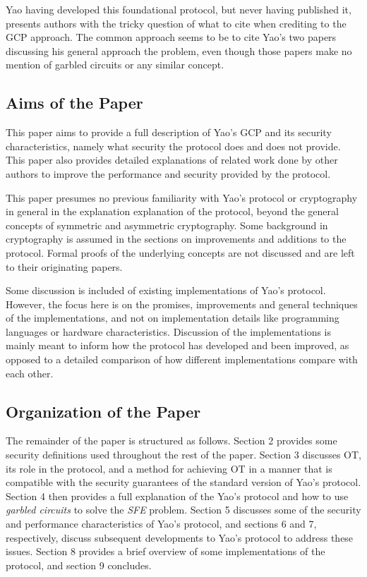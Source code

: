 Yao having developed this foundational protocol, but never having published it, presents authors with the tricky question of what to cite when crediting to the \ac{GCP} approach.  The common approach seems to be to cite Yao's two papers discussing his general approach the problem, even though those papers make no mention of garbled circuits or any similar concept.

\subsection{Aims of the Paper}

This paper aims to provide a full description of Yao's \ac{GCP} and its security characteristics, namely what security the protocol does and does not provide.  This paper also provides detailed explanations of related work done by other authors to improve the performance and security provided by the protocol.

This paper presumes no previous familiarity with Yao's protocol or cryptography in general in the explanation explanation of the protocol, beyond the general concepts of symmetric and asymmetric cryptography.  Some background in cryptography is assumed in the sections on improvements and additions to the protocol.  Formal proofs of the underlying concepts are not discussed and are left to their originating papers.

Some discussion is included of existing implementations of Yao's protocol. However, the focus here is on the promises, improvements and general techniques of the implementations, and not on implementation details like programming languages or hardware characteristics. Discussion of the implementations is mainly meant to inform how the protocol has developed and been improved, as opposed to a detailed comparison of how different implementations compare with each other.

\subsection{Organization of the Paper}

The remainder of the paper is structured as follows. Section 2 provides some security definitions used throughout the rest of the paper. Section 3 discusses \ac{OT}, its role in the protocol, and a method for achieving \ac{OT} in a manner that is compatible with the security guarantees of the standard version of Yao's protocol.  Section 4 then provides a full explanation of the Yao's protocol and how to use \emph{garbled circuits} to solve the \emph{SFE} problem. Section 5 discusses some of the security and performance characteristics of Yao's protocol, and sections 6 and 7, respectively, discuss subsequent developments to Yao's protocol to address these issues. Section 8 provides a brief overview of some implementations of the protocol, and section 9 concludes.
